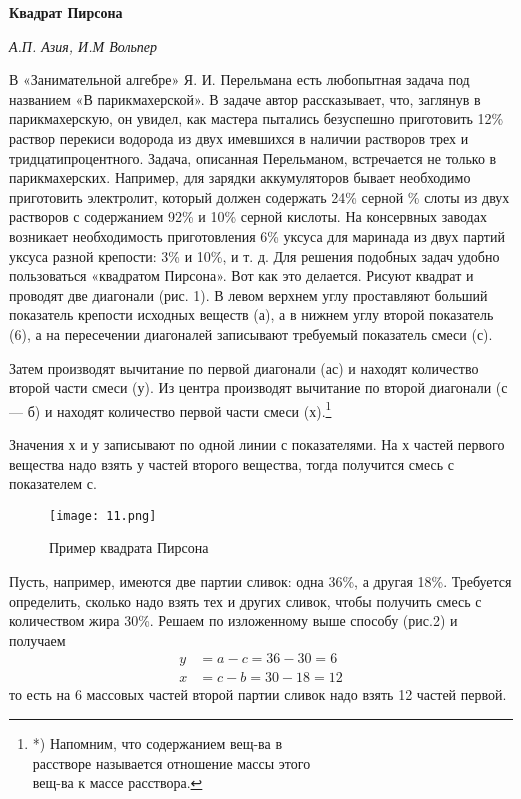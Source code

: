 \documentclass[a4paper,12pt]{article}
\author{}
\date{}
\begin{document}
{\Large \textbf{Квадрат Пирсона}} %

\begin{multicols}{2}
{\normalsize %
\textit{А.П. Азия, И.М Вольпер}

\bigskip %

В «Занимательной алгебре» Я. И. Перельмана есть любопытная задача под названием «В парикмахерской». В задаче автор рассказывает, что, заглянув в парикмахерскую, он увидел, как мастера пытались безуспешно приготовить 12\% раствор перекиси водорода из двух имевшихся в наличии растворов трех и тридцатипроцентного. Задача, описанная Перельманом, встречается не только в парикмахерских. Например, для зарядки аккумуляторов бывает необходимо приготовить электролит, который должен содержать 24\% серной \% слоты из двух растворов с содержанием 92\% и 10\% серной кислоты. На консервных заводах возникает необходимость приготовления 6\% уксуса для маринада из двух партий уксуса разной крепости: 3\% и 10\%, и т. д. Для решения подобных задач удобно пользоваться «квадратом Пирсона». Вот как это делается. Рисуют квадрат и проводят две диагонали (рис. 1). В левом верхнем углу проставляют больший показатель крепости исходных веществ (а), а в нижнем углу второй показатель (6), а на пересечении диагоналей записывают требуемый показатель смеси (с).

Затем производят вычитание по первой диагонали (ас) и находят количество второй части смеси (у). Из центра производят вычитание по второй диагонали (с — б) и находят количество первой части смеси (х).\footnote{*) Напомним, что содержанием вещ-ва в
\\
расстворе называется отношение массы этого
\\
вещ-ва к массе расствора.}

\columnbreak

Значения х и у записывают по одной линии с показателями. На х частей первого вещества надо взять у частей второго вещества, тогда получится смесь с показателем с.

\begin{figure}[H]
    \centering
    \texttt{[image: 11.png]}
    \caption{Пример квадрата Пирсона}
    \label{fig:example}
\end{figure}

Пусть, например, имеются две партии сливок: одна 36\%, а другая 18\%. Требуется определить, сколько надо взять тех и других сливок, чтобы получить смесь с количеством жира 30\%. Решаем по изложенному выше способу (рис.2) и получаем
\begin{align*}
y &= a - c = 36 - 30 = 6 \\
x &= c - b = 30 - 18 = 12
\end{align*}
то есть на 6 массовых частей второй партии сливок надо взять 12 частей первой.

}
\end{multicols}
\end{document}
